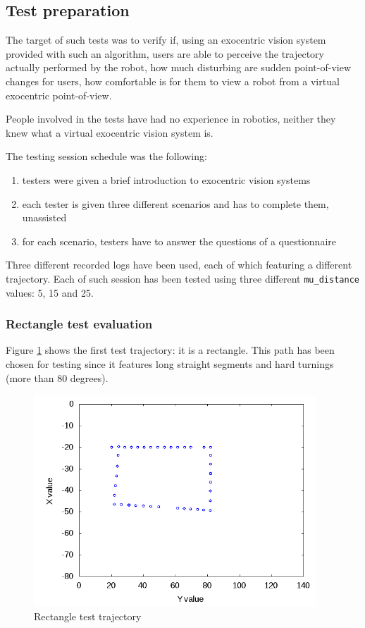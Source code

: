 \subsection{Test preparation}
\label{subsec:testpreparation}
%
The target of such tests was to verify  if, using 
an exocentric vision system provided with such an algorithm, 
users are able to perceive the trajectory actually 
performed by the robot,  how much disturbing are 
sudden point-of-view changes for users,  how 
comfortable is for them to view a robot from a 
virtual exocentric point-of-view.
%

%
People involved in the tests have had no experience in 
robotics, neither they knew what a virtual exocentric 
vision system is.
%

%
The testing session schedule was the following:
\begin{enumerate}
  \item testers were given a brief introduction to exocentric vision systems
  \item each tester is given three different scenarios and has to 
    complete them, unassisted
  \item for each scenario, testers have to answer the questions 
    of a questionnaire
\end{enumerate}
%

%
Three different recorded logs have been used, each of which featuring 
a different trajectory. Each of such session has been tested
using three different \texttt{mu\_distance} values: 5, 15 and 25. 
%
\subsubsection{Rectangle test evaluation}
\label{subsubsec:rectangletest}

Figure \ref{fig:rectangletest} shows the first test trajectory:
it is a rectangle. This path has been chosen for testing since it
features long straight segments and hard turnings (more than 80
degrees).

%
\begin{figure}[!h]
  \begin{center}
    \includegraphics[width=300pt]{img/path_session_9.png}
    \caption{Rectangle test trajectory}
    \label{fig:rectangletest}
  \end{center}
\end{figure}
%

